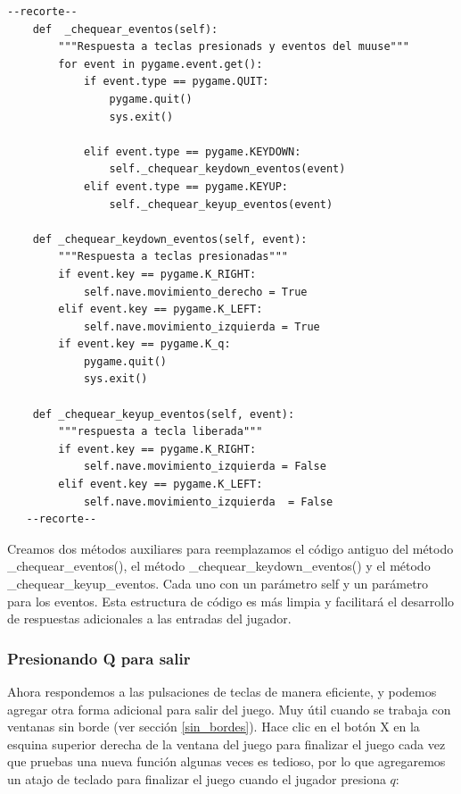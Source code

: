 \vspace{-0.2cm}
\hspace{-2.1cm}{\ttfamily \scriptsize \_alien.py}\vspace{-0.84cm}
\begin{lstlisting}
--recorte--    
    def  _chequear_eventos(self):
        """Respuesta a teclas presionads y eventos del muuse"""
        for event in pygame.event.get():
            if event.type == pygame.QUIT:
                pygame.quit()
                sys.exit()

            elif event.type == pygame.KEYDOWN:
                self._chequear_keydown_eventos(event)
            elif event.type == pygame.KEYUP:
                self._chequear_keyup_eventos(event)

    def _chequear_keydown_eventos(self, event):
        """Respuesta a teclas presionadas"""
        if event.key == pygame.K_RIGHT:
            self.nave.movimiento_derecho = True
        elif event.key == pygame.K_LEFT:
            self.nave.movimiento_izquierda = True
        if event.key == pygame.K_q:
            pygame.quit()
            sys.exit()            

    def _chequear_keyup_eventos(self, event):
        """respuesta a tecla liberada"""
        if event.key == pygame.K_RIGHT:
            self.nave.movimiento_izquierda = False
        elif event.key == pygame.K_LEFT:
            self.nave.movimiento_izquierda  = False
   --recorte-- 
\end{lstlisting}
Creamos dos métodos  auxiliares para reemplazamos el código antiguo del  método {\ttfamily \_chequear\_eventos()}, el método {\ttfamily \_chequear\_keydown\_eventos()} y el método {\ttfamily \_chequear\_keyup\_eventos}.  Cada uno con un parámetro {\ttfamily self} y un parámetro  para los eventos. Esta estructura de código es más limpia y facilitará el desarrollo de respuestas adicionales a las entradas del jugador.

 
\subsubsection{Presionando Q para salir}

Ahora respondemos a las pulsaciones de teclas de manera eficiente, y podemos agregar otra forma adicional para salir del juego. Muy útil cuando se trabaja con ventanas sin borde (ver sección \ref{sin_bordes}).
Hace clic  en el botón {\ttfamily X} en la esquina superior derecha de la ventana  del juego para finalizar el juego cada vez que pruebas una nueva función algunas veces es tedioso, por lo que agregaremos un atajo de teclado para finalizar el juego cuando el jugador presiona $q$:


